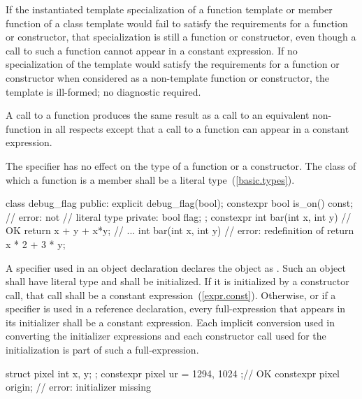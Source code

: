 \exitexample

\pnum
If the instantiated template specialization of a  function
template
or member function of a class template
would fail to satisfy the requirements for a 
function or  constructor,
that specialization is still a  function or 
constructor, even though a call to such a function cannot appear in a constant
expression. If no specialization of the template would satisfy the
requirements for a  function or  constructor
when considered as a non-template function or constructor, the template is
ill-formed; no diagnostic
required.

\pnum
A call to a  function produces the same result as a call to an equivalent
non- function in all respects except that a call to a 
function can appear in a constant expression.

\pnum
The  specifier has no
effect on the type of a  function or a  constructor.
The class of
which a  function is a member shall be a literal
type~(\ref{basic.types}). \enterexample
\begin{codeblock}
class debug_flag { 
public: 
  explicit debug_flag(bool); 
  constexpr bool is_on() const; // error:  not 
                                // literal type 
private: 
  bool flag; 
}; 
constexpr int bar(int x, int y) // OK 
    { return x + y + x*y; } 
// ... 
int bar(int x, int y)           // error: redefinition of 
    { return x * 2 + 3 * y; } 
\end{codeblock}
\exitexample

\pnum
A  specifier used in an object
declaration declares the object as .
Such an object
shall have literal type and
shall be initialized.
If it is initialized by a constructor call,
that call shall be a constant expression~(\ref{expr.const}).
Otherwise,
or if a  specifier is used in a reference declaration,
every full-expression that appears in its initializer shall be a constant expression. \enternote Each
implicit conversion used in converting the initializer expressions and each constructor call
used for the initialization is part of such a full-expression. \exitnote
\enterexample
\begin{codeblock}
struct pixel { 
  int x, y; 
}; 
constexpr pixel ur = { 1294, 1024 };// OK 
constexpr pixel origin;             // error: initializer missing 
\end{codeblock}
\exitexample

